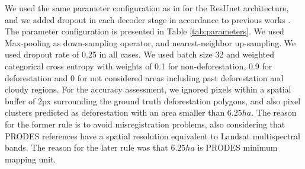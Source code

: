 We used the same parameter configuration as in \cite{ortega2021comparison} for the ResUnet architecture, and we added dropout in each decoder stage in accordance to previous works \cite{dechesne2021bayesian, nguyen2021comparison, kwon2020uncertainty}. The parameter configuration is presented in Table \ref{tab:parameters}. We used Max-pooling as down-sampling operator, and nearest-neighbor up-sampling. We used dropout rate of 0.25 in all cases. We used batch size 32 and weighted categorical cross entropy with weights of 0.1 for non-deforestation, 0.9 for deforestation and 0 for not considered areas including past deforestation and cloudy regions. For the accuracy assessment, we ignored pixels within a spatial buffer of 2px surrounding the ground truth deforestation polygons, and also pixel clusters predicted as deforestation with an area smaller than $6.25ha$. The reason for the former rule is to avoid misregistration problems, also considering that PRODES references have a spatial resolution equivalent to Landsat multispectral bands. The reason for the later rule was that $6.25ha$ is PRODES minimum mapping unit.

\usepackage{adjustbox}
\begin{table*}[ht!]
\centering

\caption{Network architecture for the ResUnet-based FCN. C: Convolution, DS: Down-sampling, RB: Residual block, D: Dropout, US: Up-sampling. Convolution layers are parametrized as ($kernel\_width \times kernel\_height, \#filters$)}
\label{tab:parameters}
\end{table*}

